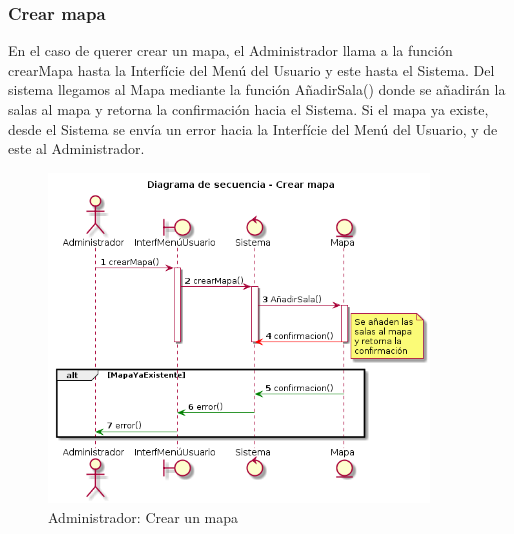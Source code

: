 \subsubsection{Crear mapa}
En el caso de querer crear un mapa, el Administrador llama a la función crearMapa hasta la Interfície del Menú del Usuario y este hasta el Sistema. Del sistema llegamos al Mapa mediante la función AñadirSala() donde se añadirán la salas al mapa y retorna la confirmación hacia el Sistema. Si el mapa ya existe, desde el Sistema se envía un error hacia la Interfície del Menú del Usuario, y de este al Administrador.
\begin{figure} [ht]
	\centering
	\includegraphics[width=0.9\textwidth]{./imatges/administrador/Crear_mapa.png}
	\caption{Administrador: Crear un mapa}
\end{figure}


\newpage
